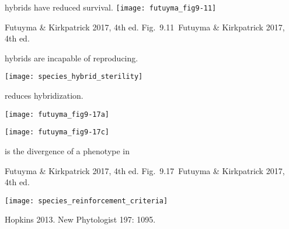 \documentclass[t]{beamer}
\newcommand{\futuyma}[1]{%
	\ifthenelse{\isempty{#1}}%
	{Futuyma \& Kirkpatrick 2017, 4th ed.}%
	{Fig.~#1~Futuyma \& Kirkpatrick 2017, 4th ed.}%
}
\newcommand{\backskip}{\vspace{-0.5\baselineskip}}
\begin{document}

\begin{frame}{ hybrids have reduced survival.}
\texttt{[image: futuyma\_fig9-11]}

\vfilll

\tiny{} \hfill \futuyma{9.11}

\end{frame}


\begin{frame}{ hybrids are incapable of reproducing.}

\vspace{-\baselineskip}

\begin{center}
\texttt{[image: species\_hybrid\_sterility]}
\end{center}


\vfilll

\tiny {}
\end{frame}


\begin{frame}{ reduces hybridization.}

\backskip

\begin{multicols}{2}
\texttt{[image: futuyma\_fig9-17a]}




\columnbreak

\texttt{[image: futuyma\_fig9-17c]}




\end{multicols}

\pause 

\hangpara {} is the divergence of a phenotype in 

\tinyfill \futuyma{9.17}

\end{frame}

\begin{frame}
\centering

\texttt{[image: species\_reinforcement\_criteria]}

\tinyfill Hopkins 2013. New Phytologist 197: 1095.

\end{frame}
\end{document}
